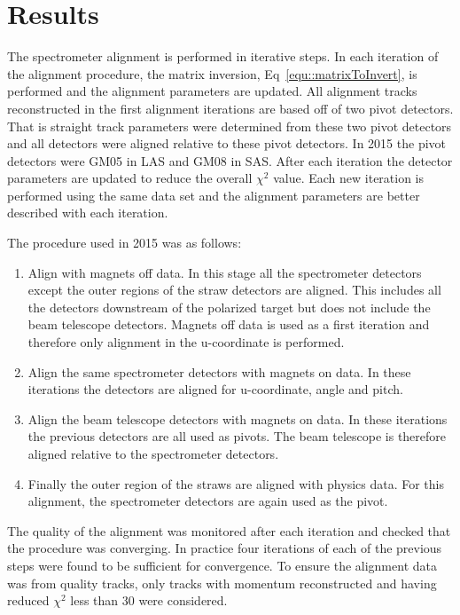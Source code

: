 \section{Results}

The spectrometer alignment is performed in iterative steps.  In each iteration
of the alignment procedure, the matrix inversion, Eq~\ref{equ::matrixToInvert},
is performed and the alignment parameters are updated.  All alignment tracks
reconstructed in the first alignment iterations are based off of two pivot
detectors.  That is straight track parameters were determined from these two
pivot detectors and all detectors were aligned relative to these pivot
detectors.  In 2015 the pivot detectors were GM05 in LAS and GM08 in SAS.  After
each iteration the detector parameters are updated to reduce the overall
$\chi^2$ value.  Each new iteration is performed using the same data set and the
alignment parameters are better described with each iteration.

The procedure used in 2015 was as follows:
\begin{enumerate}
\item Align with magnets off data.  In this stage all the spectrometer detectors
  except the outer regions of the straw detectors are aligned.  This includes
  all the detectors downstream of the polarized target but does not include the
  beam telescope detectors.  Magnets off data is used as a first iteration and
  therefore only alignment in the u-coordinate is performed.
\item Align the same spectrometer detectors with magnets on data.  In these
  iterations the detectors are aligned for u-coordinate, angle and pitch.
\item Align the beam telescope detectors with magnets on data.  In these
  iterations the previous detectors are all used as pivots.  The beam telescope
  is therefore aligned relative to the spectrometer detectors.
\item Finally the outer region of the straws are aligned with physics data.  For
  this alignment, the spectrometer detectors are again used as the pivot.
\end{enumerate}

The quality of the alignment was monitored after each iteration and checked that
the procedure was converging.  In practice four iterations of each of the
previous steps were found to be sufficient for convergence.  To ensure the
alignment data was from quality tracks, only tracks with momentum reconstructed
and having reduced $\chi^2$ less than 30 were considered.

